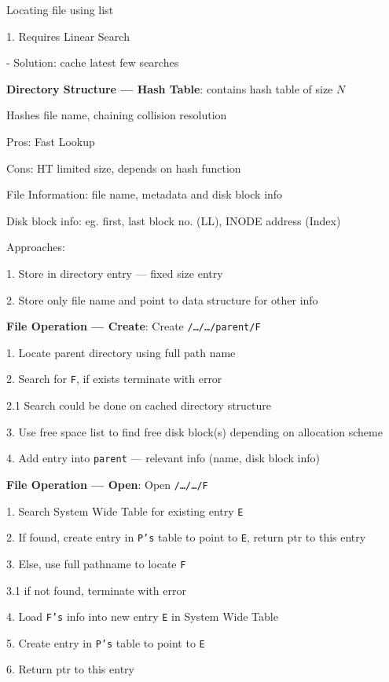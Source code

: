 \documentclass[10pt, a4paper]{article}
\newcommand{\blue}[1]{{\color{MidnightBlue}#1}}
\newcommand{\red}[1]{{\color{red}#1}}
\newcommand{\green}[1]{{\color{ForestGreen}#1}}
\newcommand{\tab}[0]{\hspace*{2mm}}
\begin{document}
\begin{multicols*}{3}
		Locating file using list

		1. Requires Linear Search 

		\tab{} - Solution: cache latest few searches

		\textbf{Directory Structure --- Hash Table}: contains hash table of size $N$

		Hashes file name, chaining collision resolution

		\green{Pros}: Fast Lookup

		\red{Cons}: HT limited size, depends on hash function

		File Information: file name, metadata and \blue{disk block info}

		\tab{} Disk block info: eg. first, last block no. (LL), INODE address (Index)
		
		Approaches:

		1. Store in directory entry --- fixed size entry

		2. Store only file name and point to data structure for other info

		\textbf{File Operation --- Create}: Create \texttt{/\ldots/\ldots/parent/F}

		1. Locate parent directory using full path name

		2. Search for \texttt{F}, if exists \red{terminate with error} 

		\tab{} 2.1 Search could be done on cached directory structure

		3. Use \blue{free space list} to find free disk block(s) depending on allocation scheme

		4. Add entry into \texttt{parent} --- relevant info (name, disk block info)

		\textbf{File Operation --- Open}: Open \texttt{/\ldots/\ldots/F}

		1. Search \blue{System Wide Table} for existing entry \texttt{E}

		2. If found, create entry in \texttt{P's} table to point to \texttt{E}, return ptr to this entry

		3. Else, use full pathname to locate \texttt{F}

		\tab{} 3.1 if not found, \red{terminate with error}

		4. Load \texttt{F's} info into new entry \texttt{E} in \blue{System Wide Table}

		5. Create entry in \texttt{P's} table to point to \texttt{E}

		6. Return ptr to this entry


\end{multicols*}
\end{document}
